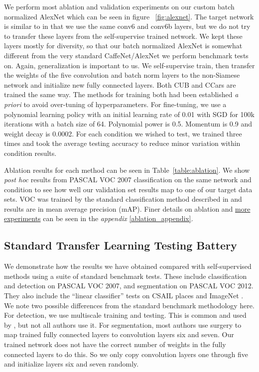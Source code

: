 \documentclass[10pt,twocolumn,letterpaper]{article}
\begin{document}
We perform most ablation and validation experiments on our custom batch normalized AlexNet which can be seen in figure ~\ref{fig:alexnet}. The target network is similar to \cite{Doersch15} in that we use the same conv6 and conv6b layers, but we do not try to transfer these layers from the self-supervise trained network. We kept these layers mostly for diversity, so that our batch normalized AlexNet is somewhat different from the very standard CaffeNet/AlexNet we perform benchmark tests on. Again, generalization is important to us. We self-supervise train, then transfer the weights of the five convolution and batch norm layers to the non-Siamese network and initialize new fully connected layers. Both CUB and CCars are trained the same way. The methods for training both had been established \emph{a priori} to avoid over-tuning of hyperparameters. For fine-tuning, we use a polynomial learning policy with an initial learning rate of 0.01 with SGD for 100k iterations with a batch size of 64. Polynomial power is 0.5. Momentum is 0.9 and weight decay is 0.0002. For each condition we wished to test, we trained three times and took the average testing accuracy to reduce minor variation within condition results. 

Ablation results for each method can be seen in Table~\ref{table:ablation}. We show \emph{post hoc} results from PASCAL VOC 2007 classification on the same network and condition to see how well our validation set results map to one of our target data sets. VOC was trained by the standard classification method described in \cite{Krahenbuhl16} and results are in mean average precision (mAP). Finer details on ablation and \underline{more experiments} can be seen in the \emph{appendix} \ref{ablation_appendix}.

\subsection{Standard Transfer Learning Testing Battery}

We demonstrate how the results we have obtained compared with self-supervised methods using a suite of standard benchmark tests. These include classification \cite{Krahenbuhl16}  and detection \cite{Girshick15} on PASCAL VOC 2007, and segmentation \cite{Long15,Pathak16} on PASCAL VOC 2012. They also include the ``linear classifier'' tests on CSAIL places and ImageNet \cite{Zhang16}. We note two possible differences from the standard benchmark methodology here. For detection, we use multiscale training and testing. This is common and used by \cite{Pathak17,Noroozi16a,Noroozi16b,Doersch15,Doersch17}, but not all authors use it. For segmentation, most authors use surgery to map trained fully connected layers to convolution layers six and seven. Our trained network does not have the correct number of weights in the fully connected layers to do this. So we only copy convolution layers one through five and initialize layers six and seven randomly.   
\end{document}
